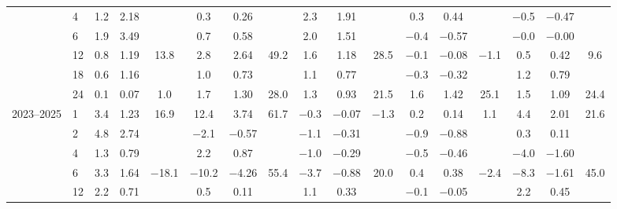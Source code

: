 \begin{table}[htbp]
{\begin{adjustbox}{max width=\linewidth, max totalheight=0.28\textheight}
\begin{tabular}{llccccccccccccccc}
 & 4 & 1.2 & 2.18 &  & \phantom{$-$0}0.3 & \phantom{$-$}0.26 &  & \phantom{$-$}2.3 & \phantom{$-$}1.91 &  & \phantom{$-$}0.3 & \phantom{$-$}0.44 &  & $-$0.5 & $-$0.47 &  \\
 & 6 & 1.9 & 3.49 &  & \phantom{$-$0}0.7 & \phantom{$-$}0.58 &  & \phantom{$-$}2.0 & \phantom{$-$}1.51 &  & $-$0.4 & $-$0.57 &  & $-$0.0 & $-$0.00 &  \\
 & 12 & 0.8 & 1.19 & \phantom{$-$}13.8 & \phantom{$-$0}2.8 & \phantom{$-$}2.64 & 49.2 & \phantom{$-$}1.6 & \phantom{$-$}1.18 & \phantom{$-$}28.5 & $-$0.1 & $-$0.08 & \phantom{0}$-$1.1 & \phantom{$-$}0.5 & \phantom{$-$}0.42 & \phantom{0}9.6 \\
 & 18 & 0.6 & 1.16 &  & \phantom{$-$0}1.0 & \phantom{$-$}0.73 &  & \phantom{$-$}1.1 & \phantom{$-$}0.77 &  & $-$0.3 & $-$0.32 &  & \phantom{$-$}1.2 & \phantom{$-$}0.79 &  \\
 & 24 & 0.1 & 0.07 & \phantom{$-$0}1.0 & \phantom{$-$0}1.7 & \phantom{$-$}1.30 & 28.0 & \phantom{$-$}1.3 & \phantom{$-$}0.93 & \phantom{$-$}21.5 & \phantom{$-$}1.6 & \phantom{$-$}1.42 & \phantom{$-$}25.1 & \phantom{$-$}1.5 & \phantom{$-$}1.09 & 24.4 \\
\midrule
2023--2025 & 1 & 3.4 & 1.23 & \phantom{$-$}16.9 & \phantom{$-$}12.4 & \phantom{$-$}3.74 & 61.7 & $-$0.3 & $-$0.07 & \phantom{0}$-$1.3 & \phantom{$-$}0.2 & \phantom{$-$}0.14 & \phantom{$-$0}1.1 & \phantom{$-$}4.4 & \phantom{$-$}2.01 & 21.6 \\
 & 2 & 4.8 & 2.74 &  & \phantom{0}$-$2.1 & $-$0.57 &  & $-$1.1 & $-$0.31 &  & $-$0.9 & $-$0.88 &  & \phantom{$-$}0.3 & \phantom{$-$}0.11 &  \\
 & 4 & 1.3 & 0.79 &  & \phantom{$-$0}2.2 & \phantom{$-$}0.87 &  & $-$1.0 & $-$0.29 &  & $-$0.5 & $-$0.46 &  & $-$4.0 & $-$1.60 &  \\
 & 6 & 3.3 & 1.64 & $-$18.1 & $-$10.2 & $-$4.26 & 55.4 & $-$3.7 & $-$0.88 & \phantom{$-$}20.0 & \phantom{$-$}0.4 & \phantom{$-$}0.38 & \phantom{0}$-$2.4 & $-$8.3 & $-$1.61 & 45.0 \\
 & 12 & 2.2 & 0.71 &  & \phantom{$-$0}0.5 & \phantom{$-$}0.11 &  & \phantom{$-$}1.1 & \phantom{$-$}0.33 &  & $-$0.1 & $-$0.05 &  & \phantom{$-$}2.2 & \phantom{$-$}0.45 &  \\
\bottomrule
\end{tabular}
\end{adjustbox}
}
\end{table}
